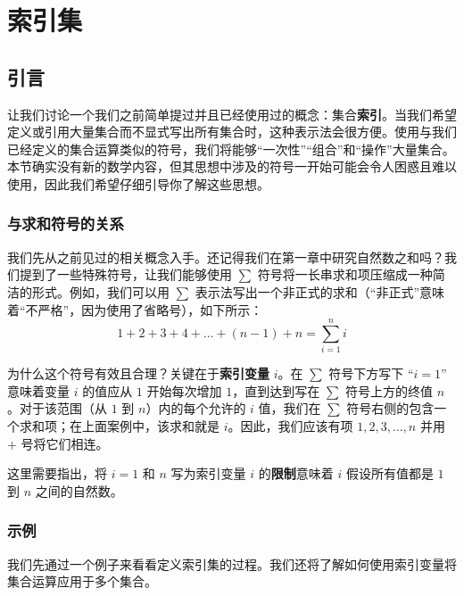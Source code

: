 \section{索引集}

\subsection{引言}

让我们讨论一个我们之前简单提过并且已经使用过的概念：集合\textbf{索引}。当我们希望定义或引用大量集合而不显式写出所有集合时，这种表示法会很方便。使用与我们已经定义的集合运算类似的符号，我们将能够``一次性''``组合''和``操作''大量集合。本节确实没有新的数学内容，但其思想中涉及的符号一开始可能会令人困惑且难以使用，因此我们希望仔细引导你了解这些思想。

\subsubsection*{与求和符号的关系}

我们先从之前见过的相关概念入手。还记得我们在第一章中研究自然数之和吗？我们提到了一些特殊符号，让我们能够使用 $\sum$ 符号将一长串求和项压缩成一种简洁的形式。例如，我们可以用 $\sum$ 表示法写出一个非正式的求和（``非正式''意味着``不严格''，因为使用了省略号），如下所示：
\[1 + 2 + 3 + 4 + \dots + (n - 1) + n = \sum_{i=1}^{n} i\]

为什么这个符号有效且合理？关键在于\textbf{索引变量} $i$。在 $\sum$ 符号下方写下 ``$i = 1$'' 意味着变量 $i$ 的值应从 $1$ 开始每次增加 $1$，直到达到写在 $\sum$ 符号上方的终值 $n$。对于该范围（从 $1$ 到 $n$）内的每个允许的 $i$ 值，我们在 $\sum$ 符号右侧的包含一个求和项；在上面案例中，该求和就是 $i$。因此，我们应该有项 $1, 2, 3,\dots, n$ 并用 $+$ 号将它们相连。

这里需要指出，将 $i = 1$ 和 $n$ 写为索引变量 $i$ 的\textbf{限制}意味着 $i$ 假设所有值都是 $1$ 到 $n$ 之间的自然数。

\subsubsection*{示例}

我们先通过一个例子来看看定义索引集的过程。我们还将了解如何使用索引变量将集合运算应用于多个集合。\\

